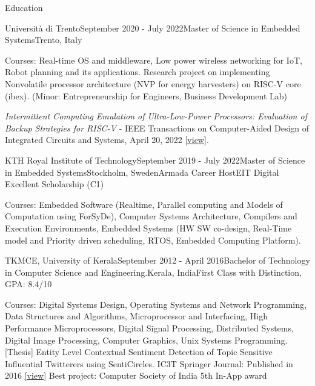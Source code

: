 \documentclass[
	a4paper, %
	11pt, %
]{resume} %
\begin{document}
\begin{rSection}{Education}
    \begin{rSubsection}{Università di Trento}{September 2020 - July 2022}{Master of Science in Embedded Systems}{Trento, Italy}

        Courses: Real-time OS and middleware, Low power wireless networking for IoT, Robot planning and its applications. Research project on implementing Nonvolatile processor architecture (NVP for energy harvesters) on RISC-V core (ibex). (Minor: Entrepreneurship for Engineers, Business Development Lab)
    
        {\color{orange}\emph{Intermittent Computing Emulation of Ultra-Low-Power Processors: Evaluation of Backup Strategies for RISC-V} - IEEE Transactions on Computer-Aided Design of Integrated Circuits and Systems, April 20, 2022} \href{https://ieeexplore.ieee.org/document/9760506}{[view]}.
    \end{rSubsection}

    \begin{rSubsection6}{KTH Royal Institute of Technology}{September 2019 - July 2022}{Master of Science in Embedded Systems}{Stockholm, Sweden}{Armada Career Host}{EIT Digital Excellent Scholarship (C1)}

        Courses: Embedded Software (Realtime, Parallel computing and Models of Computation using ForSyDe), Computer Systems Architecture, Compilers and Execution Environments, Embedded Systems (HW SW co-design, Real-Time model and Priority driven scheduling, RTOS, Embedded Computing Platform).
    \end{rSubsection6}
    
    \begin{rSubsection5}{TKMCE, University of Kerala}{September 2012 - April 2016}{Bachelor of Technology in Computer Science and Engineering.}{Kerala, India}{First Class with Distinction, GPA: 8.4/10}

        Courses: Digital Systems Design, Operating Systems and Network Programming, Data Structures and Algorithms, Microprocessor and Interfacing, High Performance Microprocessors, Digital Signal Processing, Distributed Systems, Digital Image Processing, Computer Graphics, Unix Systems Programming.\hfill
        \bigskip\break
        {\color{orange}[Thesis] Entity Level Contextual Sentiment Detection of Topic Sensitive Influential Twitterers using SentiCircles. \break
        IC3T Springer Journal: Published in 2016 \href{https://link.springer.com/chapter/10.1007/978-981-10-3223-3\_19}{[view]}\hfill \break
        Best project: Computer Society of India 5th In-App award} \hfill

    
    \end{rSubsection5}
    
		
\end{rSection}
\end{document}
